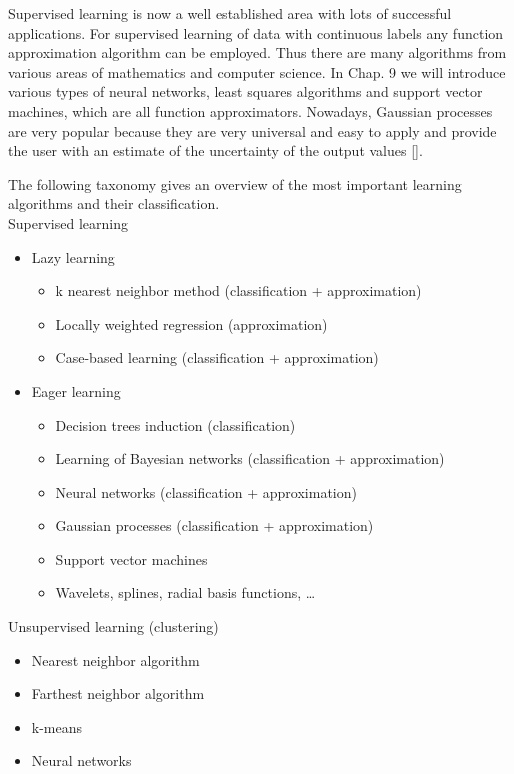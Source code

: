 \documentclass[10pt]{book}
\begin{document}
Supervised learning is now a well established area with lots of successful applications. For supervised learning of data with continuous labels any function approximation algorithm can be employed. Thus there are many algorithms from various areas of mathematics and computer science. In Chap. 9 we will introduce various types of neural networks, least squares algorithms and support vector machines, which are all function approximators. Nowadays, Gaussian processes are very popular because they are very universal and easy to apply and provide the user with an estimate of the uncertainty of the output values [\cite{rasmussen2006gpml}].

The following taxonomy gives an overview of the most important learning algorithms and their classification.\\
Supervised learning

\begin{itemize}
  \item Lazy learning
  \begin{itemize}
    \item k nearest neighbor method (classification + approximation)
    \item Locally weighted regression (approximation)
    \item Case-based learning (classification + approximation)
  \end{itemize}
  \item Eager learning
  \begin{itemize}
    \item Decision trees induction (classification)
    \item Learning of Bayesian networks (classification + approximation)
    \item Neural networks (classification + approximation)
    \item Gaussian processes (classification + approximation)
    \item Support vector machines
    \item Wavelets, splines, radial basis functions, \ldots
  \end{itemize}
\end{itemize}

Unsupervised learning (clustering)

\begin{itemize}
  \item Nearest neighbor algorithm
  \item Farthest neighbor algorithm
  \item k-means
  \item Neural networks
\end{itemize}
\end{document}
